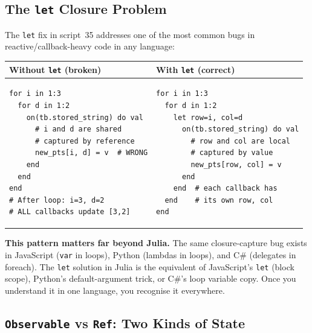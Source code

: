\documentclass[12pt, a4paper]{article}
\newcommand{\cd}[1]{\texttt{#1}}
\begin{document}
\subsection{The \texttt{let} Closure Problem}

The \cd{let} fix in script~35 addresses one of the most
common bugs in reactive/callback-heavy code in any language:

\begin{center}
\begin{tabular}{p{6.5cm}p{6.5cm}}
\toprule
\textbf{Without \cd{let} (broken)} & \textbf{With \cd{let} (correct)} \\
\midrule
\begin{minipage}[t]{6.5cm}
\begin{verbatim}
for i in 1:3
  for d in 1:2
    on(tb.stored_string) do val
      # i and d are shared
      # captured by reference
      new_pts[i, d] = v  # WRONG
    end
  end
end
# After loop: i=3, d=2
# ALL callbacks update [3,2]
\end{verbatim}
\end{minipage}
&
\begin{minipage}[t]{6.5cm}
\begin{verbatim}
for i in 1:3
  for d in 1:2
    let row=i, col=d
      on(tb.stored_string) do val
        # row and col are local
        # captured by value
        new_pts[row, col] = v
      end
    end  # each callback has
  end    # its own row, col
end
\end{verbatim}
\end{minipage} \\
\bottomrule
\end{tabular}
\end{center}

\begin{insightbox}
\textbf{This pattern matters far beyond Julia.}
The same closure-capture bug exists in JavaScript
(\cd{var} in loops), Python (lambdas in loops),
and C\# (delegates in foreach).
The \cd{let} solution in Julia is the equivalent of
JavaScript's \cd{let} (block scope), Python's
default-argument trick, or C\#'s loop variable copy.
Once you understand it in one language, you recognise
it everywhere.
\end{insightbox}

\subsection{\texttt{Observable} vs \texttt{Ref}: Two Kinds of State}
\end{document}

